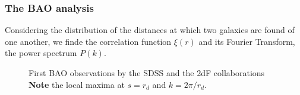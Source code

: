 \documentclass{beamer}
\begin{document}
\begin{frame}[allowframebreaks]
\frametitle{The BAO analysis}
Considering the distribution of the distances at which two galaxies are found of one another, we finde the correlation function $\xi(r)$ and its Fourier Transform, the power spectrum $P(k)$.
\begin{figure}[b] \centering
	\hspace{0.2pt}
	\caption{First BAO observations by the SDSS and the 2dF collaborations\\ \centering \textbf{Note} the local maxima at $s=r_d$ and $k=2\pi /r_d$.}
	\label{fig:2005-results}
\end{figure}
\end{frame}
\end{document}
